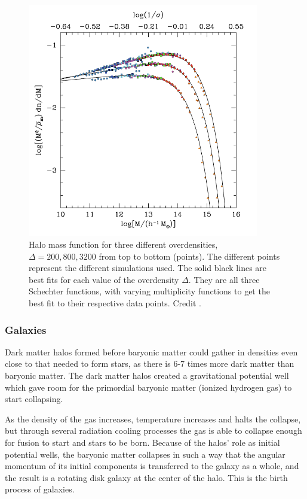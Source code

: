 \begin{figure}
    \centering
    \includegraphics[width=0.9\textwidth]{images/halo_mass_function.png}
    \caption{Halo mass function for three different overdensities, $\Delta = 200, 800, 3200$ from top to bottom (points). The different points represent the different simulations used. The solid black lines are best fits for each value of the overdensity $\Delta$. They are all three Schechter functions, with varying multiplicity functions to get the best fit to their respective data points. Credit \textcite{Tinker2008}.}
    \label{halo_mass}
\end{figure}

\subsubsection{Galaxies}
Dark matter halos formed before baryonic matter could gather in densities even close to that needed to form stars, as there is 6-7 times more dark matter than baryonic matter. The dark matter halos created a gravitational potential well which gave room for the primordial baryonic matter (ionized hydrogen gas) to start collapsing. 

As the density of the gas increases, temperature increases and halts the collapse, but through several radiation cooling processes the gas is able to collapse enough for fusion to start and stars to be born. Because of the halos' role as initial potential wells, the baryonic matter collapses in such a way that the angular momentum of its initial components is transferred to the galaxy as a whole, and the result is a rotating disk galaxy at the center of the halo. This is the birth process of galaxies.

